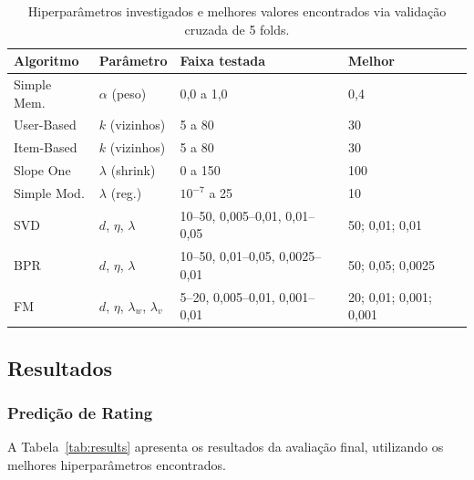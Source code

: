\documentclass[sigconf,nonacm]{acmart}
\begin{document}
\begin{table}[h]
\caption{Hiperparâmetros investigados e melhores valores encontrados via
validação cruzada de 5 folds.}
\label{tab:hyperparams}
\scriptsize
\begin{tabular}{@{}p{1.6cm}p{2.0cm}p{2.2cm}p{1.8cm}@{}}
\toprule
\textbf{Algoritmo} & \textbf{Parâmetro} & \textbf{Faixa testada} & \textbf{Melhor} \\
\midrule
Simple Mem. & $\alpha$ (peso) & 0,0 a 1,0 & 0,4 \\
User-Based  & $k$ (vizinhos) & 5 a 80 & 30 \\
Item-Based  & $k$ (vizinhos) & 5 a 80 & 30 \\
Slope One   & $\lambda$ (shrink) & 0 a 150 & 100 \\
\midrule
Simple Mod. & $\lambda$ (reg.) & $10^{-7}$ a 25 & 10 \\
SVD         & $d$, $\eta$, $\lambda$ & 10--50, 0,005--0,01, 0,01--0,05 & 50; 0,01; 0,01 \\
BPR         & $d$, $\eta$, $\lambda$ & 10--50, 0,01--0,05, 0,0025--0,01 & 50; 0,05; 0,0025 \\
FM          & $d$, $\eta$, $\lambda_w$, $\lambda_v$ & 5--20, 0,005--0,01, 0,001--0,01 & 20; 0,01; 0,001; 0,001 \\
\bottomrule
\end{tabular}
\end{table}

\subsection{Resultados}

\subsubsection{Predição de Rating}

A Tabela~\ref{tab:results} apresenta os resultados da avaliação final,
utilizando os melhores hiperparâmetros encontrados.
\end{document}
